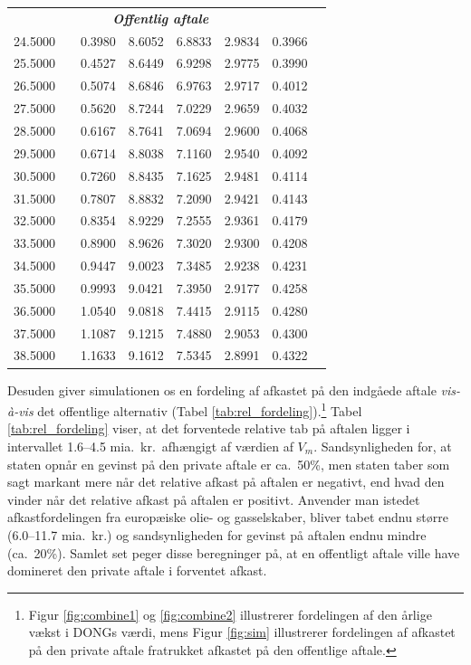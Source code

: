\documentclass{article}
\begin{document}
\begin{table}[h]
\begin{tabularx}{0.95\linewidth}{cXcccccr}
\multicolumn{7}{c}{\emph{\textbf{Offentlig aftale}}} \\
 24.5000&&0.3980&8.6052&6.8833&2.9834&0.3966 \\
 25.5000&&0.4527&8.6449&6.9298&2.9775&0.3990\\
 26.5000&&0.5074&8.6846&6.9763&2.9717&0.4012\\
 27.5000&&0.5620&8.7244&7.0229&2.9659&0.4032\\
 28.5000&&0.6167&8.7641&7.0694&2.9600&0.4068\\
 29.5000&&0.6714&8.8038&7.1160&2.9540&0.4092\\
 30.5000&&0.7260&8.8435&7.1625&2.9481&0.4114\\
 31.5000&&0.7807&8.8832&7.2090&2.9421&0.4143\\
 32.5000&&0.8354&8.9229&7.2555&2.9361&0.4179\\
 33.5000&&0.8900&8.9626&7.3020&2.9300&0.4208\\
 34.5000&&0.9447&9.0023&7.3485&2.9238&0.4231\\
 35.5000&&0.9993&9.0421&7.3950&2.9177&0.4258\\
 36.5000&&1.0540&9.0818&7.4415&2.9115&0.4280\\
 37.5000&&1.1087&9.1215&7.4880&2.9053&0.4300\\
 38.5000&&1.1633&9.1612&7.5345&2.8991&0.4322\\

\bottomrule[1pt]
	\end{tabularx}
	\begin{minipage}{\linewidth}
	\end{minipage}
\end{table}

Desuden giver simulationen os en fordeling af afkastet på den indgåede aftale \emph{vis-\`{a}-vis} det offentlige alternativ (Tabel \ref{tab:rel_fordeling}).\footnote{Figur \ref{fig:combine1} og \ref{fig:combine2} illustrerer fordelingen af den årlige vækst i DONGs værdi, mens Figur \ref{fig:sim} illustrerer fordelingen af afkastet på den private aftale fratrukket afkastet på den offentlige aftale.} Tabel \ref{tab:rel_fordeling} viser, at det forventede relative tab på aftalen ligger i intervallet 1.6--4.5 mia.\ kr.\ afhængigt af værdien af $V_m$. Sandsynligheden for, at staten opnår en gevinst på den private aftale er ca.\ 50\%, men staten taber som sagt markant mere når det relative afkast på aftalen er negativt, end hvad den vinder når det relative afkast på aftalen er positivt. Anvender man istedet afkastfordelingen fra europæiske olie- og gasselskaber, bliver tabet endnu større (6.0--11.7 mia.\ kr.) og sandsynligheden for gevinst på aftalen endnu mindre (ca.\ 20\%). Samlet set peger disse beregninger på, at en offentligt aftale ville have domineret den private aftale i forventet afkast.
\end{document}
